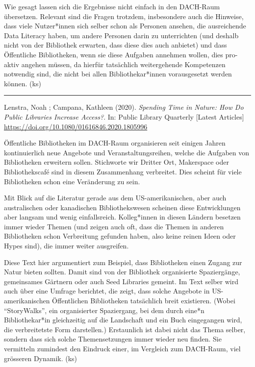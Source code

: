 \documentclass[a4paper,
fontsize=11pt,
oneside,
numbers=noperiodatend,
parskip=half-,
bibliography=totoc,
final
]{scrartcl}
\begin{document}
Wie gesagt lassen sich die Ergebnisse nicht einfach in den DACH-Raum
übersetzen. Relevant sind die Fragen trotzdem, insbesondere auch die
Hinweise, dass viele Nutzer*innen sich selber schon als Personen
ansehen, die ausreichende Data Literacy haben, um andere Personen darin
zu unterrichten (und deshalb nicht von der Bibliothek erwarten, dass
diese dies auch anbietet) und dass Öffentliche Bibliotheken, wenn sie
diese Aufgaben annehmen wollen, dies pro-aktiv angehen müssen, da
hierfür tatsächlich weitergehende Kompetenzen notwendig sind, die nicht
bei allen Bibliothekar*innen vorausgesetzt werden können. (ks)

\begin{center}\rule{0.5\linewidth}{0.5pt}\end{center}

Lenstra, Noah ; Campana, Kathleen (2020). \emph{Spending Time in Nature:
How Do Public Libraries Increase Access?}. In: Public Library Quarterly
{[}Latest Articles{]}
\url{https://doi.org/10.1080/01616846.2020.1805996}

Öffentliche Bibliotheken im DACH-Raum organisieren seit einigen Jahren
kontinuierlich neue Angebote und Veranstaltungsreihen, welche die
Aufgaben von Bibliotheken erweitern sollen. Stichworte wir Dritter Ort,
Makerspace oder Bibliothekscafé sind in diesem Zusammenhang verbreitet.
Dies scheint für viele Bibliotheken schon eine Veränderung zu sein.

Mit Blick auf die Literatur gerade aus dem US-amerikanischen, aber auch
australischen oder kanadischen Bibliothekswesen scheinen diese
Entwicklungen aber langsam und wenig einfallsreich. Kolleg*innen in
diesen Ländern besetzen immer wieder Themen (und zeigen auch oft, dass
die Themen in anderen Bibliotheken schon Verbreitung gefunden haben,
also keine reinen Ideen oder Hypes sind), die immer weiter ausgreifen.

Diese Text hier argumentiert zum Beispiel, dass Bibliotheken einen
Zugang zur Natur bieten sollten. Damit sind von der Bibliothek
organisierte Spaziergänge, gemeinsames Gärtnern oder auch Seed Libraries
gemeint. Im Text selber wird auch über eine Umfrage berichtet, die
zeigt, dass solche Angebote in US-amerikanischen Öffentlichen
Bibliotheken tatsächlich breit existieren. (Wobei \enquote{StoryWalks},
ein organisierter Spaziergang, bei dem durch eine*n Bibliothekar*in
gleichzeitig auf die Landschaft und ein Buch eingegangen wird, die
verbreitetste Form darstellen.) Erstaunlich ist dabei nicht das Thema
selber, sondern dass sich solche Themensetzungen immer wieder neu
finden. Sie vermitteln zumindest den Eindruck einer, im Vergleich zum
DACH-Raum, viel grösseren Dynamik. (ks)
\end{document}
